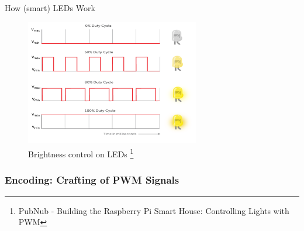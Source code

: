 \documentclass[11pt,t,usepdftitle=false,aspectratio=169]{beamer}
\begin{document}
\begin{frame}{How (smart) LEDs Work}
{        \begin{figure}
            \centering
            \includegraphics[height=5.5cm,keepaspectratio]{img/pwm-duty-cycle.png}
            \caption{\small{Brightness control on LEDs} \footnote{\tiny{PubNub - Building the Raspberry Pi Smart House: Controlling Lights with PWM}}}
        \end{figure}
    }
\end{frame}

\subsubsection{Encoding: Crafting of PWM Signals}%
\label{sub:encoding_crafting_of_pwm_signals}


\end{document}
